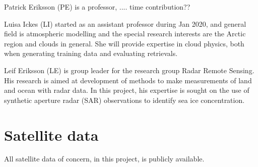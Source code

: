 \documentclass[12pt,oneside,a4paper]{article}
\begin{document}
Patrick Eriksson (PE) is a professor, .... time contribution??

Luisa Ickes (LI) started as an assistant professor during Jan 2020, and  general field is atmospheric modelling and the special research interests are the Arctic region and clouds in general. She will provide expertise in cloud physics, both when generating training data and evaluating retrievals.

Leif Eriksson (LE) is group leader for the research group Radar Remote Sensing. His research is aimed at development of methods to make measurements of land and ocean with radar data. In this project, his expertise is sought on the use of synthetic aperture radar (SAR) observations to identify sea ice concentration.

\section{Satellite data}
%
All satellite data of concern, in this project, is publicly available. 

{\footnotesize
	
}
\end{document}
